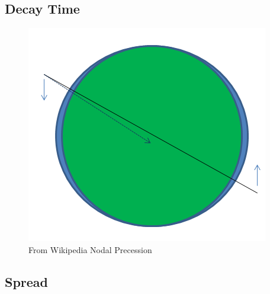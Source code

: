 \documentclass[a4paper, 12pt]{article}
\makeatletter
\renewcommand\section{\clearpage\newpage\@startsection {section}{1}{\z@}%
	{-3.5ex \@plus -1ex \@minus -.2ex}%
	{2.3ex \@plus.2ex}%
	{\normalfont\Large\bfseries}}
\makeatother
\begin{document}
\subsection{Decay Time}

\begin{figure}[h]
	\centering
	\includegraphics[scale=0.4]{Nodal_precession}
	\caption{From Wikipedia Nodal Precession}
\end{figure}


\subsection{Spread}






\printindex




\end{document}
